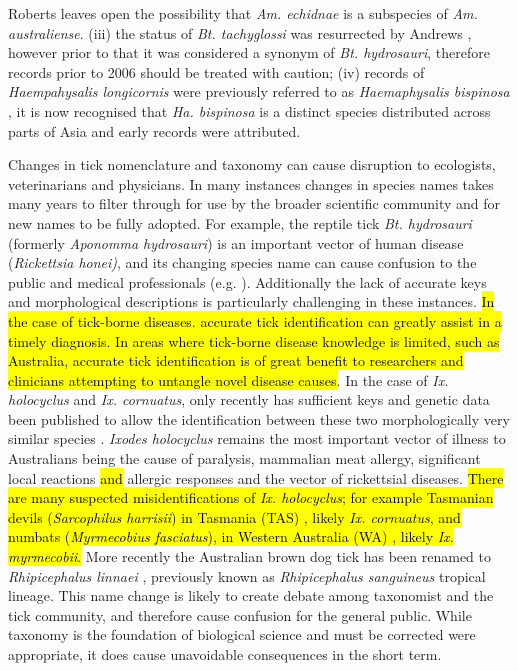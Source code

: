 \documentclass[a4paper, nobind]{templates/ociamthesis}
\begin{document}
Roberts \autocite*{robertsAustralianTicks1970} leaves open the possibility that \emph{Am. echidnae} is a subspecies of \emph{Am. australiense}.
(iii) the status of \emph{Bt. tachyglossi} was resurrected by Andrews \autocite*{andrewsSystematicStatusAponomma2006}, however prior to that it was considered a synonym of \emph{Bt. hydrosauri}, therefore records prior to 2006 should be treated with caution;
(iv) records of \emph{Haempahysalis longicornis} were previously referred to as \emph{Haemaphysalis bispinosa} \autocite{robertsSystematicStudyAustralian1963}, it is now recognised that \emph{Ha. bispinosa} is a distinct species distributed across parts of Asia and early records were attributed.

Changes in tick nomenclature and taxonomy can cause disruption to ecologists, veterinarians and physicians.
In many instances changes in species names takes many years to filter through for use by the broader scientific community and for new names to be fully adopted.
For example, the reptile tick \emph{Bt. hydrosauri} (formerly \emph{Aponomma hydrosauri}) is an important vector of human disease (\emph{Rickettsia honei)}, and its changing species name can cause confusion to the public and medical professionals (e.g. \textcite{stenosAponommaHydrosauriReptileassociated2003}).
Additionally the lack of accurate keys and morphological descriptions is particularly challenging in these instances.
\hl{In the case of tick-borne diseases. accurate tick identification can greatly assist in a timely diagnosis. In areas where tick-borne disease knowledge is limited, such as Australia, accurate tick identification is of great benefit to researchers and clinicians attempting to untangle novel disease causes}.
In the case of \emph{Ix. holocyclus} and \emph{Ix. cornuatus}, only recently has sufficient keys and genetic data been published to allow the identification between these two morphologically very similar species \autocite{songPhylogeneticPhylogeographicRelationships2011,barkerTicksAustraliaSpecies2014,kwakKeysMorphologicalIdentification2017}.
\emph{Ixodes holocyclus} remains the most important vector of illness to Australians being the cause of paralysis, mammalian meat allergy, significant local reactions \hl{and} allergic responses and the vector of rickettsial diseases.
\hl{There are many suspected misidentifications of \emph{Ix. holocyclus}; for example Tasmanian devils (\emph{Sarcophilus harrisii}) in Tasmania (TAS) \autocite{vilcinsDetectionHepatozoonSpotted2009}, likely \emph{Ix. cornuatus}, and numbats (\emph{Myrmecobius fasciatus}), in Western Australia (WA) \autocite{calabyObservationsBandedAnteater1960}, likely \emph{Ix. myrmecobii}.}
More recently the Australian brown dog tick has been renamed to \emph{Rhipicephalus linnaei} \autocite{slapetaTropicalLineageBrown2021}, previously known as \emph{Rhipicephalus sanguineus} tropical lineage.
This name change is likely to create debate among taxonomist and the tick community, and therefore cause confusion for the general public.
While taxonomy is the foundation of biological science and must be corrected were appropriate, it does cause unavoidable consequences in the short term.
\end{document}

